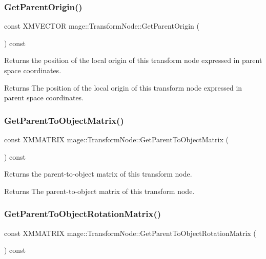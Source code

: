 \subsubsection{\texorpdfstring{Get\+Parent\+Origin()}{GetParentOrigin()}}
{\footnotesize\ttfamily const X\+M\+V\+E\+C\+T\+OR mage\+::\+Transform\+Node\+::\+Get\+Parent\+Origin (\begin{DoxyParamCaption}{ }\end{DoxyParamCaption}) const}

Returns the position of the local origin of this transform node expressed in parent space coordinates.

\begin{DoxyReturn}{Returns}
The position of the local origin of this transform node expressed in parent space coordinates. 
\end{DoxyReturn}
\hypertarget{classmage_1_1_transform_node_afb6c8dba9ae69e19bed4400477c00e42}{}\label{classmage_1_1_transform_node_afb6c8dba9ae69e19bed4400477c00e42} 
\subsubsection{\texorpdfstring{Get\+Parent\+To\+Object\+Matrix()}{GetParentToObjectMatrix()}}
{\footnotesize\ttfamily const X\+M\+M\+A\+T\+R\+IX mage\+::\+Transform\+Node\+::\+Get\+Parent\+To\+Object\+Matrix (\begin{DoxyParamCaption}{ }\end{DoxyParamCaption}) const}

Returns the parent-\/to-\/object matrix of this transform node.

\begin{DoxyReturn}{Returns}
The parent-\/to-\/object matrix of this transform node. 
\end{DoxyReturn}
\hypertarget{classmage_1_1_transform_node_ad1dd1aa5ce60b32fe4481c072891fe95}{}\label{classmage_1_1_transform_node_ad1dd1aa5ce60b32fe4481c072891fe95} 
\subsubsection{\texorpdfstring{Get\+Parent\+To\+Object\+Rotation\+Matrix()}{GetParentToObjectRotationMatrix()}}
{\footnotesize\ttfamily const X\+M\+M\+A\+T\+R\+IX mage\+::\+Transform\+Node\+::\+Get\+Parent\+To\+Object\+Rotation\+Matrix (\begin{DoxyParamCaption}{ }\end{DoxyParamCaption}) const}

